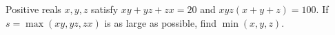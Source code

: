 Positive reals $ x,y,z $ satisfy $ xy+yz+zx=20 $ and $ xyz(x+y+z)=100 $. If $ s=\max(xy,yz,zx)$ is as large as possible, find $\min(x,y,z)$.
